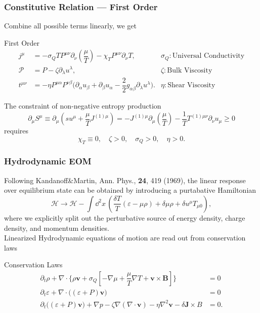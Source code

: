 \documentclass[10pt,aspectratio=43,xcolor=x11names,t]{beamer}%
\begin{document}
		\begin{frame}\frametitle{Constitutive Relation --- First Order}
			Combine all possible terms linearly, we get
			\begin{block}{First Order}
				\vspace{-1em}
				\begin{align*}
					j^\mu&=-\sigma_Q TP^{\mu\nu}\partial_\nu\left(\dfrac{\mu}{T}\right)-\chi_T P^{\mu\nu}\partial_\nu T,&\sigma_Q:\text{Universal Conductivity}\\
					\mathcal{P}&=P-\zeta \partial_\lambda u^\lambda,&\zeta:\text{Bulk Viscosity}\\
					t^{\mu\nu}&=-\eta P^{\mu\alpha}P^{\nu\beta}\bigg(\partial_\alpha u_\beta+\partial_\beta u_\alpha-\dfrac{2}{2}g_{\alpha\beta}\partial_\lambda u^\lambda\bigg).&\eta:\text{Shear Viscosity}
				\end{align*}
			\end{block}
			\pause
			The constraint of {\color{red}non-negative entropy production}
			\begin{equation*}
				\partial_\mu S^\mu\equiv \partial_\mu \left(su^\mu+\dfrac{\mu}{T}J^{(1)\mu}\right) =-J^{(1)\mu}\partial_\mu \left(\dfrac{\mu}{T}\right)-\dfrac{1}{T}T^{(1)\mu\nu}\partial_\nu u_\mu\geq0
			\end{equation*}
			requires
			\begin{equation*}
				\chi_T\equiv0,\quad \zeta>0,\quad \sigma_Q>0,\quad\eta>0. 
			\end{equation*}

		\end{frame}
		
		\begin{frame}\frametitle{Hydrodynamic EOM}
			Following {\scriptsize Kandanoff\&Martin, Ann. Phys., \textbf{24}, 419 (1969)}, the linear response over equilibrium state can be obtained by introducing a purtabative Hamiltonian
			\begin{equation*}
				\mathcal{H}\rightarrow\mathcal{H}-\int\dd^{2}x\,\left(\dfrac{\delta T}{T}(\varepsilon-\mu\rho)+\delta \mu\rho+\delta u^\mu T_{\mu0}\right),
			\end{equation*}
			where we explicitly split out the perturbative source of energy density, charge density, and momentum densities.\\
			\pause
			Linearized Hydrodynamic equations of motion are read out from conservation laws
			\begin{block}{Conservation Laws}
				\vspace{-1em}
				\begin{align*}
					\partial_t\rho+\nabla\cdot\bigg\{\rho\bm{v}+\sigma_Q\left[-\nabla\mu+\dfrac{\mu}{T}\nabla T+\bm{v}\times\bm{B}\right]\bigg\}&=0\\
					\partial_t\varepsilon+\nabla\cdot\bigg((\varepsilon+P)\bm{v}\bigg)&=0\\
					\partial_t\bigg((\varepsilon+P)\bm{v}\bigg)+\nabla p-\zeta\nabla(\nabla\cdot\bm{v})-\eta\nabla^2\bm{v}-\delta\bm{J}\times B&=0.
				\end{align*}
			\end{block}
		\end{frame}
\end{document}
